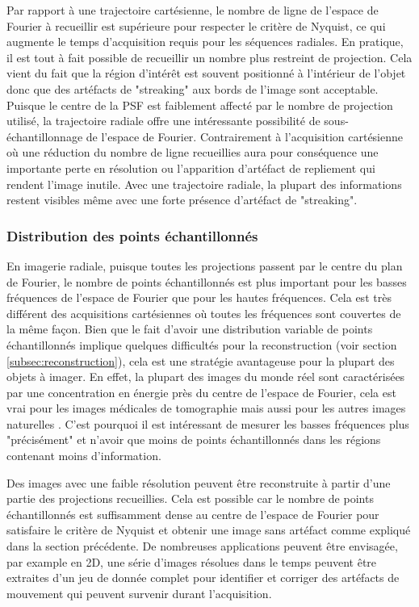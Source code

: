 Par rapport à une trajectoire cartésienne, le nombre de ligne de l'espace de Fourier à recueillir est supérieure pour respecter le critère de Nyquist, ce qui augmente le temps d'acquisition requis pour les séquences radiales. En pratique, il est tout à fait possible de recueillir un nombre plus restreint de projection. Cela vient du fait que la région d'intérêt est souvent positionné à l'intérieur de l'objet donc que des artéfacts de "streaking" aux bords de l'image sont acceptable. Puisque le centre de la PSF est faiblement affecté par le nombre de projection utilisé, la trajectoire radiale offre une intéressante possibilité de sous-échantillonnage de l'espace de Fourier. Contrairement à l'acquisition cartésienne où une réduction du nombre de ligne recueillies aura pour conséquence une importante perte en résolution ou l'apparition d'artéfact de repliement qui rendent l'image inutile. Avec une trajectoire radiale, la plupart des informations restent visibles même avec une forte présence d'artéfact de "streaking".

\subsubsection{Distribution des points échantillonnés}

En imagerie radiale, puisque toutes les projections passent par le centre du plan de Fourier, le nombre de points échantillonnés est plus important pour les basses fréquences de l'espace de Fourier que pour les hautes fréquences. Cela est très différent des acquisitions cartésiennes où toutes les fréquences sont couvertes de la même façon. Bien que le fait d'avoir une distribution variable de points échantillonnés implique quelques difficultés pour la reconstruction (voir section \ref{subsec:reconstruction}), cela est une stratégie avantageuse pour la plupart des objets à imager. En effet, la plupart des images du monde réel sont caractérisées par une concentration en énergie près du centre de l'espace de Fourier, cela est vrai pour les images médicales de tomographie mais aussi pour les autres images naturelles \cite{srivastava2003advances}. C'est pourquoi il est intéressant de mesurer les basses fréquences plus "précisément" et n'avoir que moins de points échantillonnés dans les régions contenant moins d'information. 

Des images avec une faible résolution peuvent être reconstruite à partir d'une partie des projections recueillies. Cela est possible car le nombre de points échantillonnés est suffisamment dense au centre de l'espace de Fourier pour satisfaire le critère de Nyquist et obtenir une image sans artéfact comme expliqué dans la section précédente. De nombreuses applications peuvent être envisagée, par example en 2D, une série d'images résolues dans le temps peuvent être extraites d'un jeu de donnée complet pour identifier et corriger des artéfacts de mouvement qui peuvent survenir durant l'acquisition.

